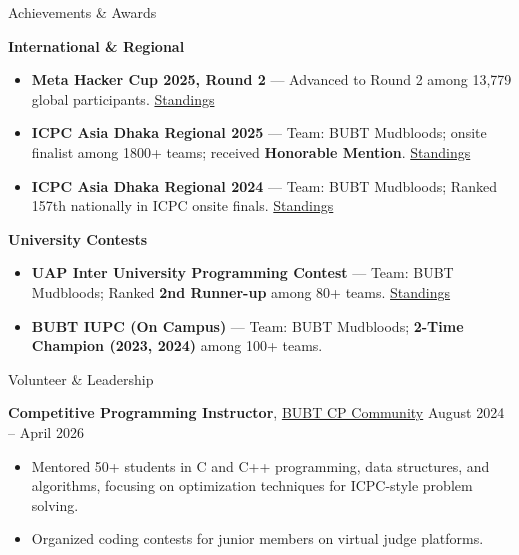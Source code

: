 \documentclass{resume}
\begin{document}

\begin{rSection}{Achievements \& Awards}

{\bf International \& Regional}
\begin{itemize}
    \item \textbf{Meta Hacker Cup 2025, Round 2} --- Advanced to Round 2 among 13,779 global participants.
    \hfill \href{https://www.facebook.com/codingcompetitions/hacker-cup/2025/certificate/24835990539367561}{Standings}
    \item \textbf{ICPC Asia Dhaka Regional 2025} --- Team: BUBT Mudbloods; onsite finalist among 1800+ teams; received \textbf{Honorable Mention}.
    \hfill \href{https://bapsoj.org/contests/icpc-dhaka-onsite-2025/standings}{Standings}
    \item \textbf{ICPC Asia Dhaka Regional 2024} --- Team: BUBT Mudbloods; Ranked 157th nationally in ICPC onsite finals.
    \hfill \href{https://bapsoj.org/contests/icpc-asia-dhaka-regional-contest-2024-onsite-round/standings}{Standings}
\end{itemize}

\vspace{2pt}
{\bf University Contests}
\begin{itemize}
    \item \textbf{UAP Inter University Programming Contest} --- Team: BUBT Mudbloods; Ranked \textbf{2nd Runner-up} among 80+ teams.
    \hfill \href{https://toph.co/c/uap-inter-university-collaborative-1-0-junior/standings}{Standings}
    \item \textbf{BUBT IUPC (On Campus)} --- Team: BUBT Mudbloods; \textbf{2-Time Champion (2023, 2024)} among 100+ teams.
\end{itemize}

\end{rSection}


\begin{rSection}{Volunteer \& Leadership}

\textbf{Competitive Programming Instructor},
\href{https://www.facebook.com/CPBUBT}{BUBT CP Community}
\hfill August 2024 -- April 2026
\vspace{2pt}
\begin{itemize}
    \item Mentored 50+ students in C and C++ programming, data structures, and algorithms, focusing on optimization techniques for ICPC-style problem solving.
    \item Organized coding contests for junior members on virtual judge platforms.
\end{itemize}

\end{rSection}
\end{document}

